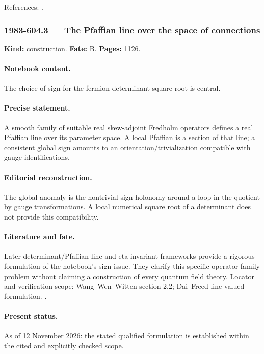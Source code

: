 \noindent References: \citep{witten1982anomaly,wangwenwitten2019new}.\par

\subsubsection{1983-604.3 --- The Pfaffian line over the space of connections}

\label{item:1983-604.3}

\noindent\textbf{Kind:} construction. \textbf{Fate:} B. \textbf{Pages:} 1126.\par

\paragraph{Notebook content.} The choice of sign for the fermion determinant square root is central.

\paragraph{Precise statement.} A smooth family of suitable real skew-adjoint Fredholm operators defines a real Pfaffian line over its parameter space. A local Pfaffian is a section of that line; a consistent global sign amounts to an orientation/trivialization compatible with gauge identifications.

\paragraph{Editorial reconstruction.} The global anomaly is the nontrivial sign holonomy around a loop in the quotient by gauge transformations. A local numerical square root of a determinant does not provide this compatibility.

\paragraph{Literature and fate.} Later determinant/Pfaffian-line and eta-invariant frameworks provide a rigorous formulation of the notebook's sign issue. They clarify this specific operator-family problem without claiming a construction of every quantum field theory. Locator and verification scope: Wang--Wen--Witten section 2.2; Dai--Freed line-valued formulation. \cite{wangwenwitten2019new,daifreed1994eta}.

\paragraph{Present status.} As of 12 November 2026: the stated qualified formulation is established within the cited and explicitly checked scope.

